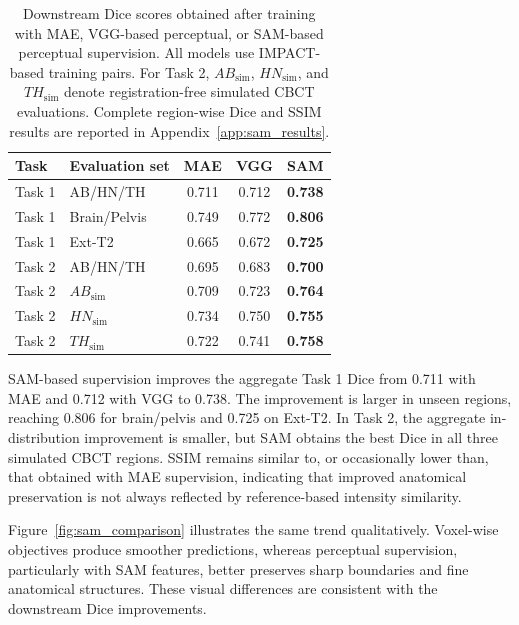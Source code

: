 \documentclass[lettersize,journal]{IEEEtran}
\begin{document}
\begin{table}[h!]
\centering
\small
\setlength{\tabcolsep}{5pt}
\renewcommand{\arraystretch}{1.15}
\caption{Downstream Dice scores obtained after training with MAE, VGG-based perceptual, or SAM-based perceptual supervision. All models use IMPACT-based training pairs. For Task 2, $AB_{\mathrm{sim}}$, $HN_{\mathrm{sim}}$, and $TH_{\mathrm{sim}}$ denote registration-free simulated CBCT evaluations. Complete region-wise Dice and SSIM results are reported in Appendix~\ref{app:sam_results}.}
\label{tab:sam_dice_compact}
\begin{tabular}{llccc}
\toprule
Task & Evaluation set & MAE & VGG & SAM \\
\midrule
Task 1 & AB/HN/TH & 0.711 & 0.712 & \textbf{0.738} \\
Task 1 & Brain/Pelvis & 0.749 & 0.772 & \textbf{0.806} \\
Task 1 & Ext-T2 & 0.665 & 0.672 & \textbf{0.725} \\
\midrule
Task 2 & AB/HN/TH & 0.695 & 0.683 & \textbf{0.700} \\
Task 2 & $AB_{\mathrm{sim}}$ & 0.709 & 0.723 & \textbf{0.764} \\
Task 2 & $HN_{\mathrm{sim}}$ & 0.734 & 0.750 & \textbf{0.755} \\
Task 2 & $TH_{\mathrm{sim}}$ & 0.722 & 0.741 & \textbf{0.758} \\
\bottomrule
\end{tabular}

\end{table}
\renewcommand{\arraystretch}{1}

SAM-based supervision improves the aggregate Task 1 Dice from 0.711 with MAE and 0.712 with VGG to 0.738. The improvement is larger in
unseen regions, reaching 0.806 for brain/pelvis and 0.725 on Ext-T2. In Task 2, the aggregate in-distribution improvement
is smaller, but SAM obtains the best Dice in all three simulated CBCT regions. SSIM remains similar to, or occasionally lower than, that obtained with MAE supervision, indicating that improved anatomical preservation is not always reflected by reference-based intensity similarity.

Figure~\ref{fig:sam_comparison} illustrates the same trend qualitatively. Voxel-wise objectives produce smoother predictions, whereas perceptual supervision, particularly with SAM features, better preserves sharp boundaries and fine anatomical structures. These visual differences are consistent with the downstream Dice improvements.
\end{document}
